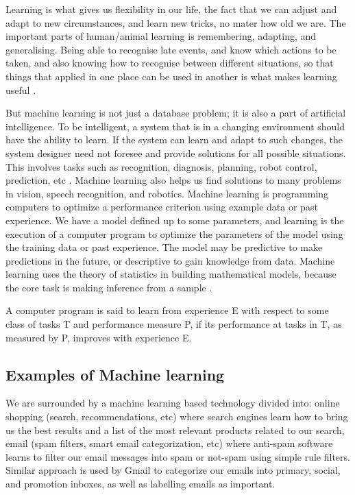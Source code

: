 Learning is what gives us flexibility
in our life, the fact that we can adjust and adapt to new circumstances, and learn new
tricks, no mater how old we are. The important parts of human/animal learning is remembering, adapting, and generalising. Being able to recognise late events, and know which actions to be taken, and also knowing how to recognise between different situations, so that things that applied in one place can be used in another is what makes learning useful \citep{marsland2015machine}. 

But machine learning is not just a database problem; it is also a part
of artificial intelligence. To be intelligent, a system that is in a changing
environment should have the ability to learn. If the system can learn and
adapt to such changes, the system designer need not foresee and provide
solutions for all possible situations. This involves tasks such as recognition, diagnosis,
planning, robot control, prediction, etc \citep{nilsson1996introduction}.
Machine learning also helps us find solutions to many problems in vision,
speech recognition, and robotics. Machine learning is programming computers to optimize a performance criterion using example data or past experience. We have a model defined
up to some parameters, and learning is the execution of a computer program
to optimize the parameters of the model using the training data or
past experience. The model may be predictive to make predictions in the
future, or descriptive to gain knowledge from data.
Machine learning uses the theory of statistics in building mathematical
models, because the core task is making inference from a sample \citep{alpaydin2014introduction}.


A computer program is said to learn from experience E with respect
to some class of tasks T and performance measure P, if its performance at tasks in
T, as measured by P, improves with experience E. 
\subsection{Examples of Machine learning}
We are surrounded by a machine learning based technology divided into: online shopping (search, recommendations, etc) where  search engines learn how to bring us the best results and a list of the most relevant products related to our search, email (spam filters, smart email categorization, etc)  where anti-spam software
learns to filter our email messages into spam or not-spam using simple rule filters. Similar approach is used by Gmail to categorize our emails into primary, social, and promotion inboxes, as well as labelling emails as important. 

